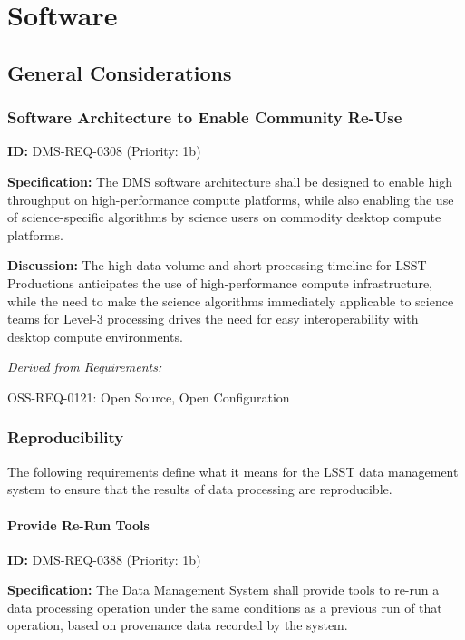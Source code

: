 \documentclass[SE,toc,lsstdraft]{lsstdoc}
\begin{document}
\section{Software}

\subsection{General Considerations}

\subsubsection{Software Architecture to Enable Community Re-Use}

\label{DMS-REQ-0308}
\textbf{ID:} DMS-REQ-0308 (Priority: 1b)

\textbf{Specification:}
The DMS software architecture shall be designed to enable high throughput on high-performance compute platforms, while also enabling the use of science-specific algorithms by science users on commodity desktop compute platforms.

\textbf{Discussion:}
The high data volume and short processing timeline for LSST Productions anticipates the use of high-performance compute infrastructure, while the need to make the science algorithms immediately applicable to science teams for Level-3 processing drives the need for easy interoperability with desktop compute environments.

\emph{Derived from Requirements:}

OSS-REQ-0121:
Open Source, Open Configuration \newline

\subsubsection{Reproducibility}

The following requirements define what it means for the LSST data management system to ensure that the results of data processing are reproducible.

\paragraph{Provide Re-Run Tools}\hfill  %

\label{DMS-REQ-0388}
\textbf{ID:} DMS-REQ-0388 (Priority: 1b)

\textbf{Specification:}
The Data Management System shall provide tools to re-run a data processing operation under the same conditions as a previous run of that operation, based on provenance data recorded by the system.
\end{document}
